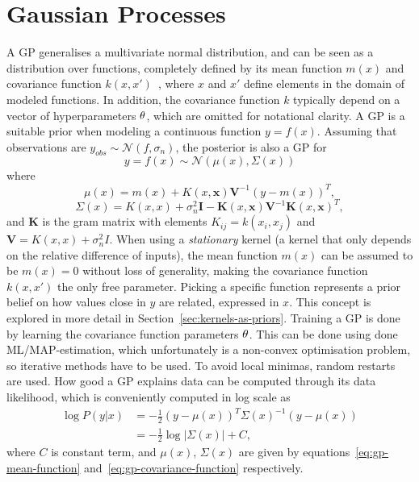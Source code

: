 \section{Gaussian Processes}
A GP generalises a multivariate normal distribution, and can be seen
as a distribution over functions, completely defined by its
mean function $m(x)$ and covariance function $k(x, x')$~\cite{Rasmussen-Williams-2006}, 
where $x$ and $x'$ define elements
in the domain of modeled functions. In addition, the covariance function $k$ typically
depend on a vector of hyperparameters $\theta$, which are
omitted for notational clarity. A GP is a suitable prior when modeling
a continuous function $y = f(x)$. Assuming that observations are $y_{obs} \sim \mathcal{N}(f,\sigma_n)$, 
the posterior is also a GP for
\begin{equation}
  \label{eq:gp}
  y = f(x) \sim \mathcal{N}(\mu(x), \Sigma(x))
\end{equation}
where
\begin{equation}
  \label{eq:gp-mean-function}
  \mu(x) = m(x) + K(x, \textbf{x})\textbf{V}^{-1}{(y-m(x))}^{T},
\end{equation}
\begin{equation}
  \label{eq:gp-covariance-function}
  \Sigma(x) = K(x, x) + \sigma^{2}_n\textbf{I} - \textbf{K}(x, \textbf{x})\textbf{V}^{-1}{\textbf{K}(x, \textbf{x})}^{T},
\end{equation}
and $\textbf{K}$ is the gram matrix with elements $K_{ij} = k(x_i, x_j)$ 
and $\textbf{V} = K(x, x) + \sigma_n^2I$.
When using a \textit{stationary} kernel (a kernel that only depends on the
relative difference of inputs), the mean function $m(x)$ can be assumed to be $m(x) = 0$
without loss of generality, making the covariance function $k(x, x')$
the only free parameter. Picking a specific function represents a prior
belief on how values close in $y$ are related, expressed in $x$. This
concept is explored in more detail in Section~\ref{sec:kernels-as-priors}.
Training a GP is done by learning the covariance function parameters $\theta$.
This can be done using done ML/MAP-estimation, which unfortunately is a non-convex
optimisation problem, so iterative methods have to be used. To avoid
local minimas, random restarts are used. How good a GP explains data
can be computed through its data likelihood, which is conveniently
computed in log scale as 
\begin{equation}
  \label{eq:gp-log-likelihood}
  \begin{split}
    \log P(y|x) & = -\frac{1}{2}{(y - \mu(x))}^{T}{\Sigma(x)}^{-1}(y - \mu(x)) \\
    & = -\frac{1}{2}\log{|\Sigma(x)|}+C,
  \end{split}
\end{equation}
where $C$ is constant term, and $\mu(x)$, $\Sigma(x)$ are given by
equations~\ref{eq:gp-mean-function} and~\ref{eq:gp-covariance-function} 
respectively.

